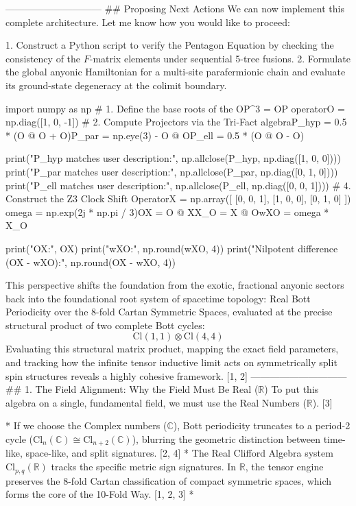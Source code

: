 ------------------------------
## Proposing Next Actions
We can now implement this complete architecture. Let me know how you would like to proceed:

   1. Construct a Python script to verify the Pentagon Equation by checking the consistency of the $F$-matrix elements under sequential 5-tree fusions.
   2. Formulate the global anyonic Hamiltonian for a multi-site parafermionic chain and evaluate its ground-state degeneracy at the colimit boundary.

import numpy as np
# 1. Define the base roots of the OP^3 = OP operatorO = np.diag([1, 0, -1])
# 2. Compute Projectors via the Tri-Fact algebraP_hyp = 0.5 * (O @ O + O)P_par = np.eye(3) - O @ OP_ell = 0.5 * (O @ O - O)

print("P_hyp matches user description:", np.allclose(P_hyp, np.diag([1, 0, 0])))
print("P_par matches user description:", np.allclose(P_par, np.diag([0, 1, 0])))
print("P_ell matches user description:", np.allclose(P_ell, np.diag([0, 0, 1])))
# 4. Construct the Z3 Clock Shift OperatorX = np.array([
    [0, 0, 1],
    [1, 0, 0],
    [0, 1, 0]
])
omega = np.exp(2j * np.pi / 3)OX = O @ XX_O = X @ OwXO = omega * X_O

print("OX:\n", OX)
print("wXO:\n", np.round(wXO, 4))
print("Nilpotent difference (OX - wXO):\n", np.round(OX - wXO, 4))


This perspective shifts the foundation from the exotic, fractional anyonic sectors back into the foundational root system of spacetime topology: Real Bott Periodicity over the 8-fold Cartan Symmetric Spaces, evaluated at the precise structural product of two complete Bott cycles:
$$\text{Cl}(1,1) \otimes \text{Cl}(4,4)$$ 
Evaluating this structural matrix product, mapping the exact field parameters, and tracking how the infinite tensor inductive limit acts on symmetrically split spin structures reveals a highly cohesive framework. [1, 2] 
------------------------------
## 1. The Field Alignment: Why the Field Must Be Real ($\mathbb{R}$)
To put this algebra on a single, fundamental field, we must use the Real Numbers ($\mathbb{R}$). [3] 

* If we choose the Complex numbers ($\mathbb{C}$), Bott periodicity truncates to a period-2 cycle ($\text{Cl}_n(\mathbb{C}) \cong \text{Cl}_{n+2}(\mathbb{C})$), blurring the geometric distinction between time-like, space-like, and split signatures. [2, 4] 
* The Real Clifford Algebra system $\text{Cl}_{p,q}(\mathbb{R})$ tracks the specific metric sign signatures. In $\mathbb{R}$, the tensor engine preserves the 8-fold Cartan classification of compact symmetric spaces, which forms the core of the 10-Fold Way. [1, 2, 3] 
* 

